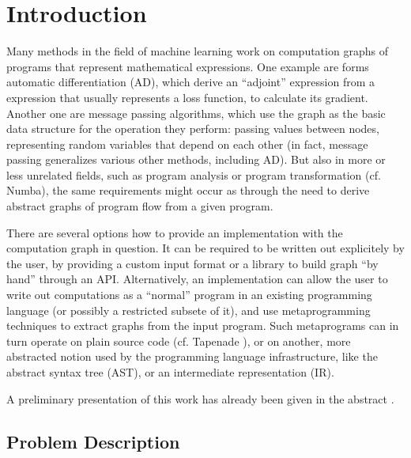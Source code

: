 \chapter{Introduction}
\label{cha:introduction}

Many methods in the field of machine learning work on computation graphs of programs that represent
mathematical expressions.  One example are forms automatic differentiation (AD), which derive an
\enquote{adjoint} expression from a expression that usually represents a loss function, to calculate
its gradient.  Another one are message passing algorithms, which use the graph as the basic data
structure for the operation they perform: passing values between nodes, representing random
variables that depend on each other (in fact, message passing generalizes various other methods,
including AD).  But also in more or less unrelated fields, such as program analysis or program
transformation (cf. Numba), the same requirements might occur as through the need to
derive abstract graphs of program flow from a given program.

There are several options how to provide an implementation with the computation graph in question.
It can be required to be written out explicitely by the user, by providing a custom input
format or a library to build graph \enquote{by hand} through an API.  Alternatively, an implementation can allow the user to write out
computations as a \enquote{normal} program in an existing programming language (or possibly a
restricted subsete of it), and use metaprogramming techniques to extract graphs from the input
program.  Such metaprograms can in turn operate on plain source code (cf. Tapenade
\cite{tapenadedevelopers2019tapenade}), or on another, more abstracted notion used by the
programming language infrastructure, like the abstract syntax tree (AST), or an intermediate
representation (IR).

A preliminary presentation of this work has already been given in the abstract
\cite{gabler2019graph}.

\section{Problem Description}
\label{sec:problem-description}

